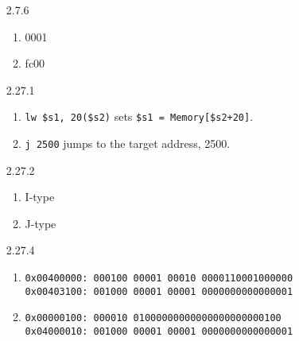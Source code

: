 \documentclass[12pt,letterpaper]{article}
\begin{document}
\begin{enumerate}
	\item[2.7.6]
		\begin{enumerate}
			\item 0001
			\item fc00
		\end{enumerate}

	\item[2.27.1]
		\begin{enumerate}
			\item {\tt lw \$s1, 20(\$s2)} sets {\tt \$s1 = Memory[\$s2+20]}.
			\item {\tt j 2500} jumps to the target address, 2500.
		\end{enumerate}

	\item[2.27.2]
		\begin{enumerate}
			\item I-type
			\item J-type
		\end{enumerate}

	\item[2.27.4]
		\begin{enumerate}
			\item {\tt 0x00400000: 000100 00001 00010 0000110001000000 \\
				0x00403100: 001000 00001 00001 0000000000000001}
			\item {\tt 0x00000100: 000010 01000000000000000000000100 \\
				0x04000010: 001000 00001 00001 0000000000000001}
		\end{enumerate}

\end{enumerate}
\end{document}
